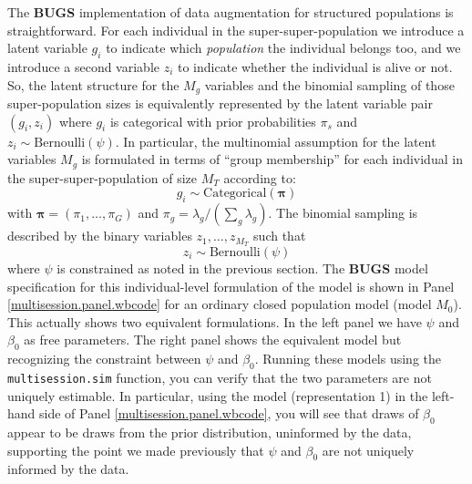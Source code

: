 The {\bf BUGS} implementation of data augmentation for structured
populations is straightforward.  For each individual in the
super-super-population we introduce a latent variable $g_{i}$ to indicate which
{\it  population} the individual belongs too, and we introduce a
second variable $z_{i}$ to indicate whether the individual is %
alive or not.  So, the latent structure for the $M_{g}$ variables
and the binomial sampling of those super-population sizes is
equivalently represented by the latent variable pair $(g_{i},z_{i})$
where $g_{i}$ is categorical with prior probabilities $\pi_{s}$ and
$z_{i} \sim \mbox{Bernoulli}(\psi)$.  In particular, the multinomial
assumption for the latent variables $M_{g}$ is formulated in terms of
``group membership'' for each individual in the super-super-population of
size $M_{T}$ according to:
\[
 g_{i} \sim \mbox{Categorical}\left( {\bm \pi} \right)
\]
with ${\bm \pi} = (\pi_{1}, \ldots, \pi_{G})$ and $\pi_{g} =
\lambda_{g}/(\sum_{g} \lambda_{g})$.  The binomial sampling is
described by the binary variables $z_{1},\ldots,z_{M_{T}}$ such that
\[
 z_{i} \sim \mbox{Bernoulli}(\psi)
\]
where $\psi$ is constrained as noted in the previous section.  The
{\bf BUGS} model specification for this individual-level formulation
of the model is shown in Panel \ref{multisession.panel.wbcode} for an
ordinary closed population model (model $M_{0}$).  This actually shows
two equivalent formulations. In the left panel we have $\psi$ and
$\beta_{0}$ as free parameters.  The right panel shows the equivalent
model but recognizing the constraint between $\psi$ and $\beta_{0}$.
Running these models using the \mbox{\tt multisession.sim} function,
you can verify that the two parameters are not uniquely estimable. In
particular, using the model (representation 1) in the left-hand side
of Panel \ref{multisession.panel.wbcode}, you will see that draws of
$\beta_{0}$ appear to be draws from the prior distribution, uninformed
by the data, supporting the point we made previously that $\psi$ and
$\beta_0$ are not uniquely informed by the data.

